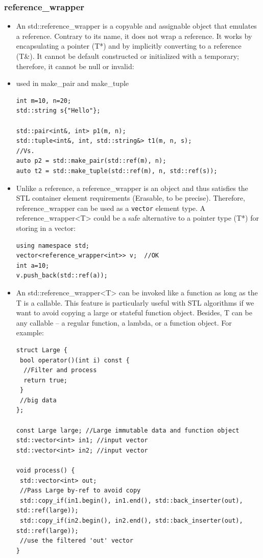 \documentclass[a4paper,11pt,twoside]{book}
\begin{document}
\subsubsection{reference\_wrapper}
\begin{itemize}
    \item An std::reference\_wrapper is a copyable and assignable object that emulates a reference. Contrary to its name, it does not wrap a reference. It works by encapsulating a pointer (T*) and by implicitly converting to a reference (T\&). It cannot be default constructed or initialized with a temporary; therefore, it cannot be null or invalid:
    \item used in make\_pair and make\_tuple
\begin{lstlisting}
int m=10, n=20;
std::string s{"Hello"};

std::pair<int&, int> p1(m, n);
std::tuple<int&, int, std::string&> t1(m, n, s);
//Vs.
auto p2 = std::make_pair(std::ref(m), n);
auto t2 = std::make_tuple(std::ref(m), n, std::ref(s));
\end{lstlisting}

    \item Unlike a reference, a reference\_wrapper is an object and thus satisfies the STL container element requirements (Erasable, to be precise). Therefore, reference\_wrapper can be used as a \texttt{vector} element type.  A reference\_wrapper<T> could be a safe alternative to a pointer type (T*) for storing in a vector:
\begin{lstlisting}
using namespace std;
vector<reference_wrapper<int>> v;  //OK
int a=10;
v.push_back(std::ref(a));
\end{lstlisting}
    \item An std::reference\_wrapper<T> can be invoked like a function as long as the T is a callable. This feature is particularly useful with STL algorithms if we want to avoid copying a large or stateful function object.  Besides, T can be any callable – a regular function, a lambda, or a function object. For example:
\begin{lstlisting}
struct Large {
 bool operator()(int i) const {
  //Filter and process
  return true;
 }
 //big data
};

const Large large; //Large immutable data and function object
std::vector<int> in1; //input vector
std::vector<int> in2; //input vector

void process() {
 std::vector<int> out;
 //Pass Large by-ref to avoid copy 
 std::copy_if(in1.begin(), in1.end(), std::back_inserter(out), std::ref(large));  
 std::copy_if(in2.begin(), in2.end(), std::back_inserter(out), std::ref(large)); 
 //use the filtered 'out' vector
}
\end{lstlisting}
\end{itemize}
\end{document}
